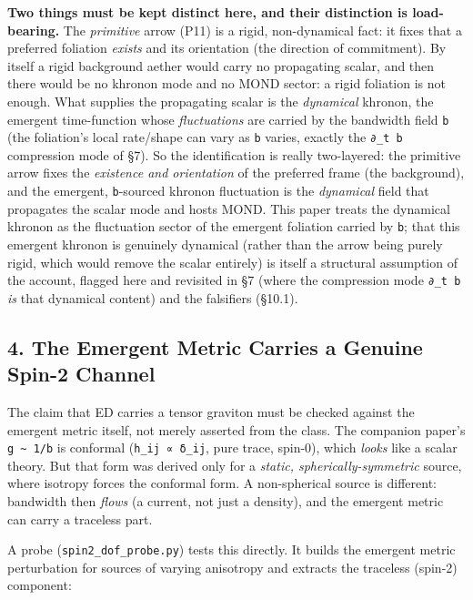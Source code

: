 \documentclass[
]{article}
\begin{document}
\textbf{Two things must be kept distinct here, and their distinction is
load-bearing.} The \emph{primitive} arrow (P11) is a rigid,
non-dynamical fact: it fixes that a preferred foliation \emph{exists}
and its orientation (the direction of commitment). By itself a rigid
background aether would carry no propagating scalar, and then there
would be no khronon mode and no MOND sector: a rigid foliation is not
enough. What supplies the propagating scalar is the \emph{dynamical}
khronon, the emergent time-function whose \emph{fluctuations} are
carried by the bandwidth field \texttt{b} (the foliation's local
rate/shape can vary as \texttt{b} varies, exactly the \texttt{∂\_t\ b}
compression mode of §7). So the identification is really two-layered:
the primitive arrow fixes the \emph{existence and orientation} of the
preferred frame (the background), and the emergent, \texttt{b}-sourced
khronon fluctuation is the \emph{dynamical} field that propagates the
scalar mode and hosts MOND. This paper treats the dynamical khronon as
the fluctuation sector of the emergent foliation carried by \texttt{b};
that this emergent khronon is genuinely dynamical (rather than the arrow
being purely rigid, which would remove the scalar entirely) is itself a
structural assumption of the account, flagged here and revisited in §7
(where the compression mode \texttt{∂\_t\ b} \emph{is} that dynamical
content) and the falsifiers (§10.1).

\subsection{4. The Emergent Metric Carries a Genuine Spin-2
Channel}\label{the-emergent-metric-carries-a-genuine-spin-2-channel}

The claim that ED carries a tensor graviton must be checked against the
emergent metric itself, not merely asserted from the class. The
companion paper's \texttt{g\ \textasciitilde{}\ 1/b} is conformal
(\texttt{h\_ij\ ∝\ δ\_ij}, pure trace, spin-0), which \emph{looks} like
a scalar theory. But that form was derived only for a \emph{static,
spherically-symmetric} source, where isotropy forces the conformal form.
A non-spherical source is different: bandwidth then \emph{flows} (a
current, not just a density), and the emergent metric can carry a
traceless part.

A probe (\texttt{spin2\_dof\_probe.py}) tests this directly. It builds
the emergent metric perturbation for sources of varying anisotropy and
extracts the traceless (spin-2) component:
\end{document}

